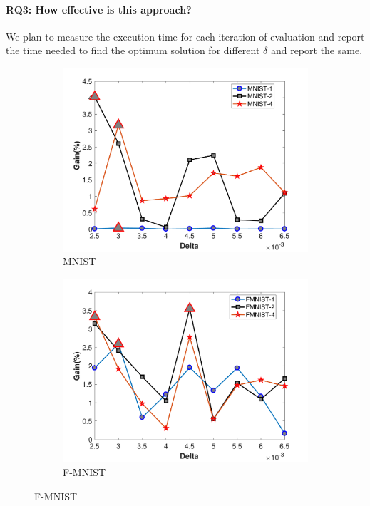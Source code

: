 \paragraph{\textbf{RQ3: How effective is this approach?}}
We plan to measure the execution time for each iteration of evaluation and report the time needed to find the optimum solution for different $\delta$ and report the same.
\begin{figure}
	\begin{subfigure}[b]{.46\linewidth}{}
		\includegraphics[keepaspectratio = True, scale = 0.31]{figures/MNIST_Delta}
		\centering
		\caption{MNIST}
		\vspace{2.0em}
	\end{subfigure}
	\begin{subfigure}[b]{.46\linewidth}
		\includegraphics[keepaspectratio = True, scale = 0.31]{figures/FMNIST_Delta}
		\caption{F-MNIST}
		\vspace{2.0em}
	\end{subfigure}
	
	\label{fig:delta}
\end{figure}
